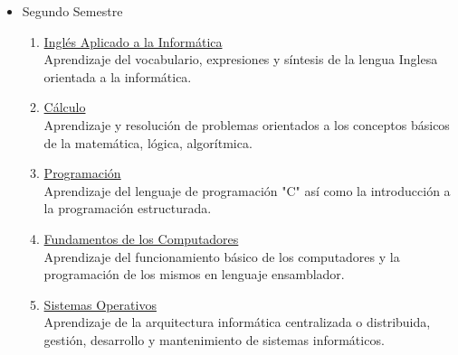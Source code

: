 \begin{itemize}
\item Segundo Semestre
\begin{enumerate}[resume]
\item \underline{Inglés Aplicado a la Informática}\\Aprendizaje del vocabulario, expresiones y síntesis de la lengua Inglesa orientada a la informática. 
\item \underline{Cálculo}\\Aprendizaje y resolución de problemas orientados a  los conceptos básicos de la matemática, lógica, algorítmica.
\item \underline{Programación}\\Aprendizaje del lenguaje de programación "C" así como la introducción a la programación estructurada. 
\item \underline{Fundamentos de los Computadores}\\Aprendizaje del funcionamiento básico de los computadores y la programación de los mismos en lenguaje ensamblador. 
\item \underline{Sistemas Operativos}\\Aprendizaje de la arquitectura informática centralizada o distribuida, gestión, desarrollo y mantenimiento de sistemas informáticos.
\end{enumerate}
\end{itemize}

\begin{table}[]
\centering
\caption{Tabla de asignaturas del Primer Curso Académico}
\label{tab:1}
\end{table}

